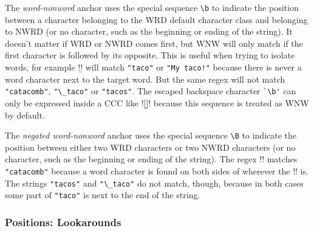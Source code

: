 \begin{description} \itemsep -1pt

\item[WNW:] The \emph{word-nonword} anchor uses the special sequence \verb!\b! to indicate the position between a character belonging to the WRD default character class and belonging to NWRD (or no character, such as the beginning or ending of the string).  It doesn't matter if WRD or NWRD comes first, but WNW will only match if the first character is followed by its opposite.  This is useful when trying to isolate words, for example \cverb!\btaco\b! will match \verb!"taco"! or \verb|"My taco!"|  because there is never a word character next to the target word.  But the same regex will not match \verb!"catacomb"!, \verb!"\_taco"! or \verb!"tacos"!.  The escaped backspace character \verb!`\b'! can only be expressed inside a CCC like \cverb![\b]! because this sequence is treated as WNW by default.

\item[NWNW:] The \emph{negated word-nonword} anchor uses the special sequence \verb!\B! to indicate the position between either two WRD characters or two NWRD characters (or no character, such as the beginning or ending of the string).  The regex \cverb!\Btaco\B! matches \verb!"catacomb"! because a word character is found on both sides of wherever the \cverb!\B! is.  The strings \verb!"tacos"! and \verb!"\_taco"! do not match, though, because in both cases some part of \verb!"taco"! is next to the end of the string.
\end{description}

\subsubsection*{Positions: Lookarounds}

